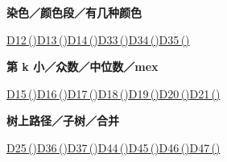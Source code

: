 \documentclass[10pt,a4paper]{article}
\begin{document}
\begin{minipage}{\linewidth}\textbf{染色／颜色段／有几种颜色}\par{\fontsize{9.5}{12}\selectfont \hyperref[D12]{D12\,(\pageref*{D12})}\hspace{.5em}\allowbreak \hyperref[D13]{D13\,(\pageref*{D13})}\hspace{.5em}\allowbreak \hyperref[D14]{D14\,(\pageref*{D14})}\hspace{.5em}\allowbreak \hyperref[D33]{D33\,(\pageref*{D33})}\hspace{.5em}\allowbreak \hyperref[D34]{D34\,(\pageref*{D34})}\hspace{.5em}\allowbreak \hyperref[D35]{D35\,(\pageref*{D35})}}\end{minipage}\par\vspace{5pt}
\begin{minipage}{\linewidth}\textbf{第 k 小／众数／中位数／mex}\par{\fontsize{9.5}{12}\selectfont \hyperref[D15]{D15\,(\pageref*{D15})}\hspace{.5em}\allowbreak \hyperref[D16]{D16\,(\pageref*{D16})}\hspace{.5em}\allowbreak \hyperref[D17]{D17\,(\pageref*{D17})}\hspace{.5em}\allowbreak \hyperref[D18]{D18\,(\pageref*{D18})}\hspace{.5em}\allowbreak \hyperref[D19]{D19\,(\pageref*{D19})}\hspace{.5em}\allowbreak \hyperref[D20]{D20\,(\pageref*{D20})}\hspace{.5em}\allowbreak \hyperref[D21]{D21\,(\pageref*{D21})}}\end{minipage}\par\vspace{5pt}
\begin{minipage}{\linewidth}\textbf{树上路径／子树／合并}\par{\fontsize{9.5}{12}\selectfont \hyperref[D25]{D25\,(\pageref*{D25})}\hspace{.5em}\allowbreak \hyperref[D36]{D36\,(\pageref*{D36})}\hspace{.5em}\allowbreak \hyperref[D37]{D37\,(\pageref*{D37})}\hspace{.5em}\allowbreak \hyperref[D44]{D44\,(\pageref*{D44})}\hspace{.5em}\allowbreak \hyperref[D45]{D45\,(\pageref*{D45})}\hspace{.5em}\allowbreak \hyperref[D46]{D46\,(\pageref*{D46})}\hspace{.5em}\allowbreak \hyperref[D47]{D47\,(\pageref*{D47})}}\end{minipage}\par\vspace{5pt}
\end{document}
